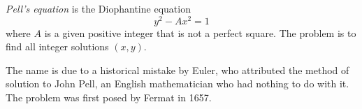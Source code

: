 \textit{Pell's equation} is the Diophantine equation
$$y^2 - Ax^2 = 1$$
where $A$ is a given positive integer that is not a perfect square. The problem is to find all integer solutions $(x, y)$.

The name is due to a historical mistake by Euler, who attributed the method of solution to John Pell, an English mathematician who had nothing to do with it. The problem was first posed by Fermat in 1657.
